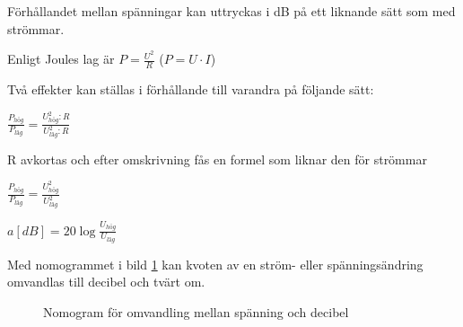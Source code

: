 Förhållandet mellan spänningar kan uttryckas i dB på ett liknande sätt som med
strömmar.

Enligt Joules lag är \(P = \frac{U^2}{R}\) (\(P = U \cdot I\))

Två effekter kan ställas i förhållande till varandra på följande sätt:

\(\frac{P_{hög}}{P_{låg}}=\frac{U_{hög}^2:R}{U_{låg}^2:R}\)

R avkortas och efter omskrivning fås en formel som liknar den för strömmar

\(\frac{P_{hög}}{P_{låg}} = \frac{U_{hög}^2}{U_{låg}^2}\)

\(a[dB] = 20\log \frac{U_{hög}}{U_{låg}}\)

Med nomogrammet i bild \ref{ellära-nomogram-db-spänning} kan kvoten av en ström- eller spänningsändring omvandlas
till decibel och tvärt om.

\begin{figure}
  \caption{Nomogram för omvandling mellan spänning och decibel}
  \label{ellära-nomogram-db-spänning}
\end{figure}

